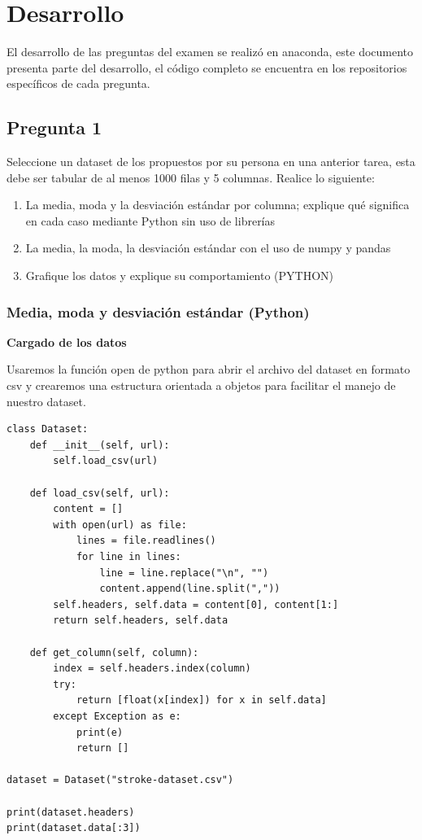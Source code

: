 \documentclass[letter]{article}
\begin{document}
\section{Desarrollo}
\label{sec:org8407312}

El desarrollo de las preguntas del examen se realizó en anaconda, este documento
presenta parte del desarrollo, el código completo se encuentra en los
repositorios específicos de cada pregunta.

\subsection{Pregunta 1}
\label{sec:org472257e}

Seleccione un dataset de los propuestos por su persona en una anterior tarea, esta debe ser tabular de al menos 1000 filas y 5 columnas. Realice lo siguiente:

\begin{enumerate}
\item La media, moda y la desviación estándar por columna; explique qué significa en cada caso mediante Python sin uso de librerías
\item La media, la moda, la desviación estándar con el uso de numpy y pandas
\item Grafique los datos y explique su comportamiento (PYTHON)
\end{enumerate}

\subsubsection{Media, moda y desviación estándar (Python)}
\label{sec:orga3f02fe}

\textbf{Cargado de los datos}

Usaremos la función open de python para abrir el archivo del dataset en formato csv y crearemos una estructura orientada a objetos para facilitar el manejo de nuestro dataset.

\begin{verbatim}
class Dataset:
    def __init__(self, url):
        self.load_csv(url)

    def load_csv(self, url):
        content = []
        with open(url) as file:
            lines = file.readlines()
            for line in lines:
                line = line.replace("\n", "")
                content.append(line.split(","))
        self.headers, self.data = content[0], content[1:]
        return self.headers, self.data

    def get_column(self, column):
        index = self.headers.index(column)
        try:
            return [float(x[index]) for x in self.data]
        except Exception as e:
            print(e)
            return []

dataset = Dataset("stroke-dataset.csv")

print(dataset.headers)
print(dataset.data[:3])
\end{verbatim}
\end{document}
